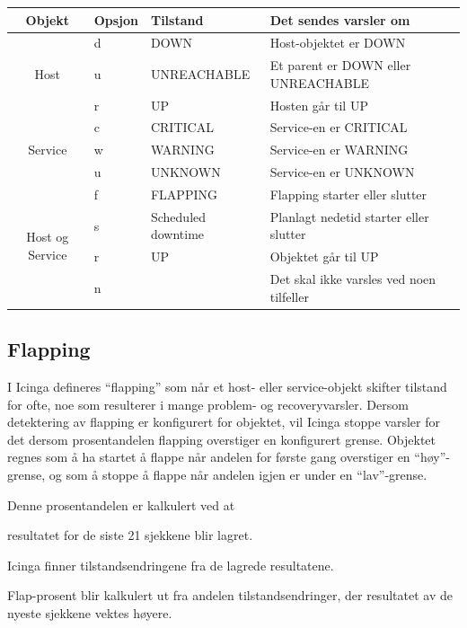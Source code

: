\begin{table}
\begin{center}
\begin{tabular}{| c | l | l | p{7cm} |} \hline
        \textbf{Objekt} & \textbf{Opsjon} & \textbf{Tilstand} & \textbf{Det sendes varsler om} \\ \hline
	\multirow{3}{*}{Host} & d & DOWN 			& Host-objektet er DOWN 			\\ \cline{2-4}
					    & u & UNREACHABLE 		& Et parent er DOWN eller UNREACHABLE		\\ \cline{2-4}	
					    & r & UP 			& Hosten går til UP				\\ \hline 
        \multirow{3}{*}{Service} 	    & c & CRITICAL 		& Service-en er CRITICAL 			\\ \cline{2-4}
					    & w & WARNING  		& Service-en er WARNING  			\\ \cline{2-4}
					    & u & UNKNOWN  		& Service-en er UNKNOWN  			\\ \hline
	\multirow{4}{*}{Host og Service} & f & FLAPPING           	& Flapping starter eller slutter 		\\ \cline{2-4}
					    & s & Scheduled downtime 	& Planlagt nedetid starter eller slutter 	\\ \cline{2-4}
				 	    & r & UP                 	& Objektet går til UP 				\\ \cline{2-4}  
					    & n &                    	& Det skal ikke varsles ved noen tilfeller 	\\ \cline{2-4}
	\hline
\end{tabular}
\label{objekt_varsling}
\end{center}
\end{table}

\subsection{Flapping}
I Icinga defineres ``flapping'' som når et host- eller service-objekt skifter tilstand for ofte, noe som resulterer i mange problem- og recoveryvarsler\cite{icingaflapping}. Dersom detektering av flapping er konfigurert for objektet, vil Icinga stoppe varsler for det dersom prosentandelen flapping overstiger en konfigurert grense. Objektet regnes som å ha startet å flappe når andelen for første gang overstiger en ``høy''-grense, og som å stoppe å flappe når andelen igjen er under en ``lav''-grense.

Denne prosentandelen er kalkulert ved at
\begin{enumerate*}
	\item resultatet for de siste 21 sjekkene blir lagret.
	\item Icinga finner tilstandsendringene fra de lagrede resultatene.
	\item Flap-prosent blir kalkulert ut fra andelen tilstandsendringer, der resultatet av de nyeste sjekkene vektes høyere.
\end{enumerate*}

